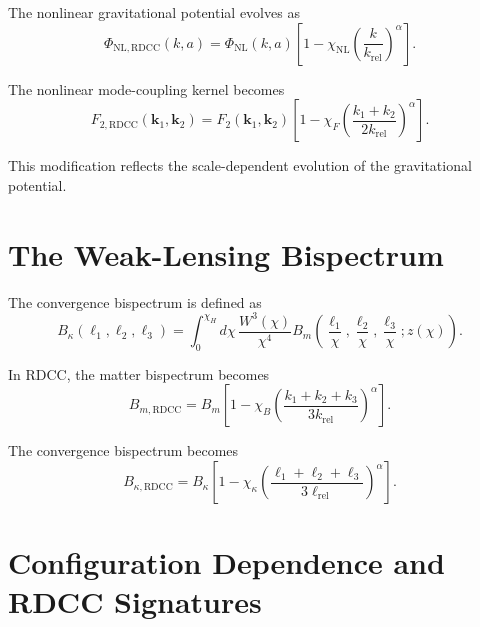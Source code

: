 \documentclass[11pt,a4paper]{article}
\begin{document}
The nonlinear gravitational potential evolves as
\begin{equation}
    \Phi_{\mathrm{NL,RDCC}}(k,a)
    = \Phi_{\mathrm{NL}}(k,a)
      \left[
        1 - \chi_{\mathrm{NL}}
        \left(\frac{k}{k_{\mathrm{rel}}}\right)^{\alpha}
      \right].
\end{equation}

The nonlinear mode-coupling kernel becomes
\begin{equation}
    F_{2,\mathrm{RDCC}}(\mathbf{k}_{1},\mathbf{k}_{2})
    = F_{2}(\mathbf{k}_{1},\mathbf{k}_{2})
      \left[
        1 - \chi_{F}
        \left(
          \frac{k_{1} + k_{2}}{2k_{\mathrm{rel}}}
        \right)^{\alpha}
      \right].
\end{equation}

This modification reflects the scale-dependent evolution of the gravitational 
potential.
\section{The Weak-Lensing Bispectrum}

The convergence bispectrum is defined as
\begin{equation}
    B_{\kappa}(\ell_{1},\ell_{2},\ell_{3})
    = \int_{0}^{\chi_{H}}
      d\chi\,
      \frac{
        W^{3}(\chi)
      }{
        \chi^{4}
      }
      B_{m}\left(
        \frac{\ell_{1}}{\chi},
        \frac{\ell_{2}}{\chi},
        \frac{\ell_{3}}{\chi};
        z(\chi)
      \right).
\end{equation}

In RDCC, the matter bispectrum becomes
\begin{equation}
    B_{m,\mathrm{RDCC}}
    = B_{m}
      \left[
        1 - \chi_{B}
        \left(
          \frac{k_{1} + k_{2} + k_{3}}{3k_{\mathrm{rel}}}
        \right)^{\alpha}
      \right].
\end{equation}

The convergence bispectrum becomes
\begin{equation}
    B_{\kappa,\mathrm{RDCC}}
    = B_{\kappa}
      \left[
        1 - \chi_{\kappa}
        \left(
          \frac{\ell_{1} + \ell_{2} + \ell_{3}}{3\ell_{\mathrm{rel}}}
        \right)^{\alpha}
      \right].
\end{equation}
\section{Configuration Dependence and RDCC Signatures}
\end{document}
